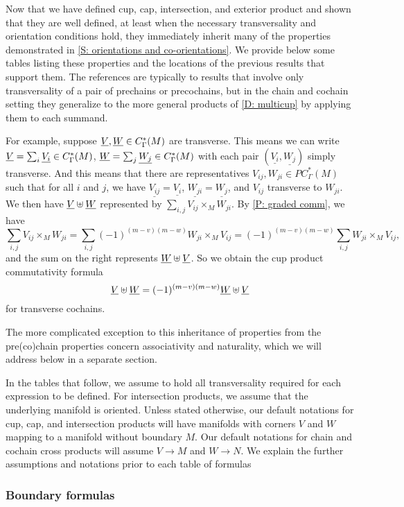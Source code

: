 
Now that we have defined cup, cap, intersection, and exterior product and shown that they are well defined, at least when the necessary transversality and orientation conditions hold, they immediately inherit many of the properties demonstrated in \cref{S: orientations and co-orientations}. We provide below some tables listing these properties and the locations of the previous results that support them. The references are typically to results that involve only transversality of a pair of prechains or precochains, but in the chain and cochain setting they generalize to the more general products of \cref{D: multicup} by applying them to each summand.

For example, suppose $\underline{V},\underline{W} \in C^*_\Gamma(M)$ are transverse. This means we can write $\underline{V} = \sum_i \underline{V_i} \in C_\Gamma^*(M)$, $\underline{W} = \sum_j \underline{W_j} \in C_\Gamma^*(M)$ with each pair $(\underline{V_i},\underline{W_j})$ simply transverse. And this means that there are representatives $V_{ij},W_{ji} \in PC_\Gamma^*(M)$ such that for all $i$ and $j$, we have $\underline{V_{ij}} = \underline{V_i}$, $\underline{W_{ji}} = \underline{W_j}$, and $V_{ij}$ transverse to $W_{ji}$. We then have $\underline{V}\uplus \underline{W}$ represented by
$\sum_{i,j} V_{ij} \times_M W_{ji}$. By \cref{P: graded comm}, we have
$$\sum_{i,j} V_{ij} \times_M W_{ji} = \sum_{i,j} (-1)^{(m-v)(m-w)}W_{ji} \times_M V_{ij} = (-1)^{(m-v)(m-w)}\sum_{i,j} W_{ji} \times_M V_{ij},$$
and the sum on the right represents $\underline{W}\uplus \underline{V}$. So we obtain the cup product commutativity formula $$\underline{V}\uplus\underline{W} = (-1)^{(m-v)(m-w)}\underline{W}\uplus\underline{V}$$ for transverse cochains.

The more complicated exception to this inheritance of properties from the pre(co)chain properties concern associativity and naturality, which we will address below in a separate section.

In the tables that follow, we assume to hold all transversality required for each expression to be defined. For intersection products, we assume that the underlying manifold is oriented.
Unless stated otherwise, our default notations for cup, cap, and intersection products will have manifolds with corners $V$ and $W$ mapping to a manifold without boundary $M$. Our default notations for chain and cochain cross products will assume $V \to M$ and $W \to N$. We explain the further assumptions and notations prior to each table of formulas

\subsubsection{Boundary formulas}

